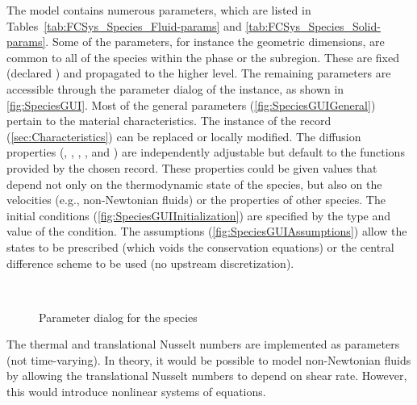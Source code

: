 The  model contains numerous parameters, which are listed in Tables~\ref{tab:FCSys_Species_Fluid-params} and \ref{tab:FCSys_Species_Solid-params}.  Some of the parameters, for instance the geometric dimensions, are common to all of the species within the phase or the subregion.  These are fixed (declared ) and propagated to the higher level.  The remaining parameters are accessible through the parameter dialog of the  instance, as shown in \autoref{fig:SpeciesGUI}.  Most of the general parameters (\autoref{fig:SpeciesGUIGeneral}) pertain to the material characteristics.  The instance of the  record (\autoref{sec:Characteristics}) can be replaced or locally modified.  The diffusion properties (, , , , and ) are independently adjustable but default to the functions provided by the chosen  record.  These properties could be given values that depend not only on the thermodynamic state of the species, but also on the velocities (e.g., non-Newtonian fluids) or the properties of other species.  The initial conditions (\autoref{fig:SpeciesGUIInitialization}) are specified by the type and value of the condition.  The assumptions (\autoref{fig:SpeciesGUIAssumptions}) allow the states to be prescribed (which voids the conservation equations) or the central difference scheme to be used (no upstream discretization).  

\begin{figure}[htbp]
  \ 
\end{figure}

\begin{figure}[htb]
  \ContinuedFloat
  \caption[Parameter dialog for the  species]{Parameter dialog for the  species}
  \label{fig:SpeciesGUI}
\end{figure}

The thermal and translational Nusselt numbers are implemented as parameters (not time-varying).  In theory, it would be possible to model non-Newtonian fluids by allowing the translational Nusselt numbers to depend on shear rate.  However, this would introduce nonlinear systems of equations. 

